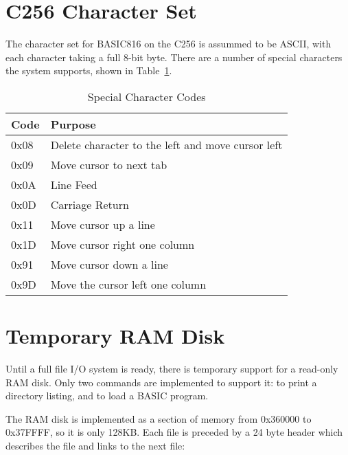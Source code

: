 \documentclass{report}
\begin{document}
    \section*{C256 Character Set}

    The character set for BASIC816 on the C256 is assummed to be ASCII, with each character taking a full 8-bit byte.
    There are a number of special characters the system supports, shown in Table~\ref{char_codes}.


    \begin{table}[!htb]
        \begin{center}
            \begin{tabular}{|l|l|} \hline
                Code & Purpose \\ \hline\hline
                0x08 & Delete character to the left and move cursor left \\ \hline
                0x09 & Move cursor to next tab \\ \hline
                0x0A & Line Feed \\ \hline
                0x0D & Carriage Return \\ \hline
                0x11 & Move cursor up a line \\ \hline
                0x1D & Move cursor right one column \\ \hline
                0x91 & Move cursor down a line \\ \hline
                0x9D & Move the cursor left one column \\ \hline
            \end{tabular}
            \caption{Special Character Codes}
            \label{char_codes}
        \end{center}
    \end{table}
    
    
    \section*{Temporary RAM Disk}

    Until a full file I/O system is ready, there is temporary support for a read-only RAM disk.
    Only two commands are implemented to support it:  to print a directory listing,
    and  to load a BASIC program.

    The RAM disk is implemented as a section of memory from 0x360000 to 0x37FFFF, so it is only 128KB.
    Each file is preceded by a 24 byte header which describes the file and links to the next file:
\end{document}
